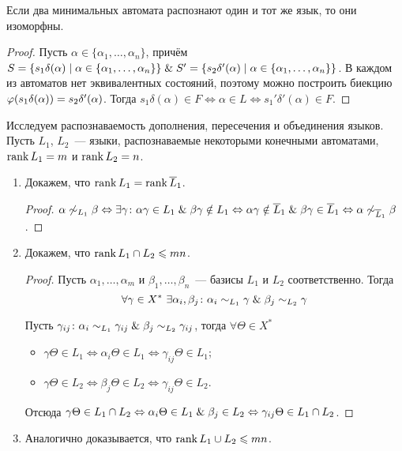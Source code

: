 \begin{statement}
Если два минимальных автомата распознают один и тот же язык, то они изоморфны.
\end{statement}
\begin{proof}
Пусть $\alpha \in \{ \alpha_1, \ldots, \alpha_n \}$, причём $S = \{ s_1 \delta(\alpha) \mid \alpha \in \{ \alpha_1, \ldots, \alpha_n \} \} \opbr\lAnd S' \opbr= \{ s_2 \delta'(\alpha) \mid \alpha \opbr\in \{ \alpha_1, \ldots, \alpha_n \} \}$.
В каждом из автоматов нет эквивалентных состояний, поэтому можно построить биекцию $\varphi(s_1 \delta(\alpha)) \opbr= s_2 \delta'(\alpha)$.
Тогда $s_1 \delta(\alpha) \in F \Leftrightarrow \alpha \in L \Leftrightarrow s_1' \delta'(\alpha) \in F$.
\end{proof}

Исследуем распознаваемость дополнения, пересечения и объединения языков.
Пусть $L_1$, $L_2$~--- языки, распознаваемые некоторыми конечными автоматами, $\operatorname{rank} L_1 = m$ и $\operatorname{rank} L_2 = n$.
\begin{enumerate}
	\item Докажем, что $\operatorname{rank} L_1 = \operatorname{rank} \overline L_1$.
	\begin{proof}
	$\alpha \not\sim_{L_1} \beta \Leftrightarrow
	\exists \gamma \colon \alpha \gamma \in L_1 \mathrel{\&} \beta \gamma \notin L_1 \Leftrightarrow
	\alpha \gamma \notin \overline L_1 \mathrel{\&} \beta \gamma \in \overline L_1 \Leftrightarrow
	\alpha \not\sim_{\overline L_1} \beta$.
	\end{proof}
	
	\item Докажем, что $\operatorname{rank} L_1 \cap L_2 \leqslant mn$.
	\begin{proof}
	Пусть $\alpha_1, \ldots, \alpha_m$ и $\beta_1, \ldots, \beta_n$~--- базисы $L_1$ и $L_2$ соответственно.
	Тогда
	\begin{equation*}
	\forall \gamma \in X^* \ \exists \alpha_i, \beta_j \colon \alpha_i \sim_{L_1} \gamma \mathrel{\&} \beta_j \sim_{L_2} \gamma
	\end{equation*}
	
	Пусть $\gamma_{ij} \colon \alpha_i \sim_{L_1} \gamma_{ij} \mathrel{\&} \beta_j \sim_{L_2} \gamma_{ij}$, тогда $\forall \Theta \in X^*$
	\begin{itemize}
		\item $\gamma \Theta \in L_1 \Leftrightarrow
		\alpha_i \Theta \in L_1 \Leftrightarrow
		\gamma_{ij} \Theta \in L_1$;
		\item $\gamma \Theta \in L_2 \Leftrightarrow
		\beta_j \Theta \in L_2 \Leftrightarrow
		\gamma_{ij} \Theta \in L_2$.
	\end{itemize}
	
	Отсюда $\gamma \Theta \in L_1 \cap L_2 \Leftrightarrow
	\alpha_i \Theta \in L_1 \mathrel{\&} \beta_j \in L_2 \Leftrightarrow
	\gamma_{ij} \Theta \in L_1 \cap L_2$.
	\end{proof}
	
	\item Аналогично доказывается, что $\operatorname{rank} L_1 \cup L_2 \leqslant mn$.
\end{enumerate}

